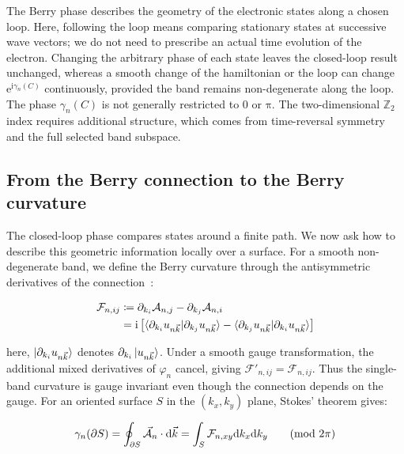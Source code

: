 The Berry phase describes the geometry of the electronic states along a chosen loop.
Here, following the loop means comparing stationary states at successive wave vectors;
we do not need to prescribe an actual time evolution of the electron.
Changing the arbitrary phase of each state leaves the closed-loop result unchanged,
whereas a smooth change of the hamiltonian or the loop can change $\mathrm{e}^{\mathrm{i}\gamma_n(C)}$ continuously,
provided the band remains non-degenerate along the loop.
The phase $\gamma_n(C)$ is not generally restricted to $0$ or $\mathrm{\pi}$.
The two-dimensional $\mathbb{Z}_2$ index requires additional structure, which comes from time-reversal symmetry and the full selected band subspace.

\subsection{From the Berry connection to the Berry curvature}
\label{subsec:berry_curvature_appendix}

The closed-loop phase compares states around a finite path.
We now ask how to describe this geometric information locally over a surface.
For a smooth non-degenerate band, we define the Berry curvature through the antisymmetric derivatives of the connection~\cite{xiao2010berry}:

\begin{equation}
\begin{aligned}
    \mathcal{F}_{n,ij}
    &\coloneqq\partial_{k_i}\mathcal{A}_{n,j}
    -\partial_{k_j}\mathcal{A}_{n,i} \\
    &=\mathrm{i}\left[
    \braket{\partial_{k_i}u_{n\vec{k}}|\partial_{k_j}u_{n\vec{k}}}
    -\braket{\partial_{k_j}u_{n\vec{k}}|\partial_{k_i}u_{n\vec{k}}}
    \right]
\end{aligned}
\label{abelian_berry_curvature_appendix}
\end{equation}

here, $\ket{\partial_{k_i}u_{n\vec{k}}}$ denotes $\partial_{k_i}\ket{u_{n\vec{k}}}$.
Under a smooth gauge transformation, the additional mixed derivatives of $\varphi_n$ cancel, giving $\mathcal{F}'_{n,ij}=\mathcal{F}_{n,ij}$.
Thus the single-band curvature is gauge invariant even though the connection depends on the gauge.
For an oriented surface $S$ in the $(k_x,k_y)$ plane, Stokes' theorem gives:

\begin{equation}
    \gamma_n(\partial S)
    =\oint_{\partial S}\vec{\mathcal{A}}_n\cdot\mathrm{d}\vec{k}
    =\int_S\mathcal{F}_{n,xy}\mathrm{d} k_x\mathrm{d} k_y
    \qquad (\mathrm{mod}\ 2\mathrm{\pi})
\label{berry_curvature_stokes_appendix}
\end{equation}

